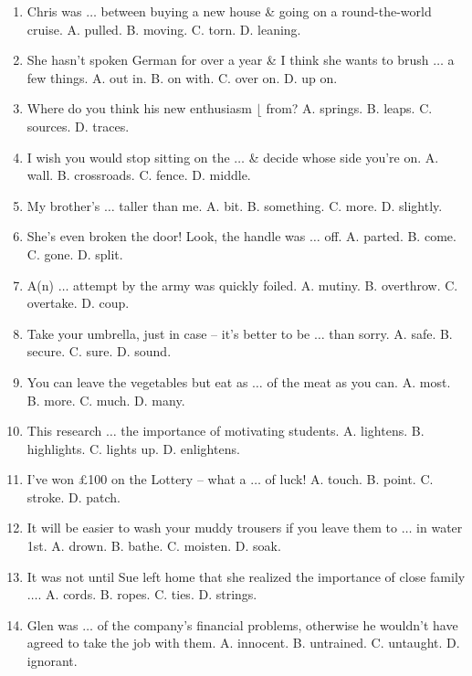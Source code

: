 \documentclass{article}
\numberwithin{equation}{section}
\begin{document}
\begin{enumerate}[leftmargin=8mm]
	\item Chris was $\ldots$ between buying a new house \& going on a round-the-world cruise. {\sf A.} pulled. {\sf B.} moving. {\sf C.} torn. {\sf D.} leaning.
	\item She hasn't spoken German for over a year \& I think she wants to brush $\ldots$ a few things. {\sf A.} out in. {\sf B.} on with. {\sf C.} over on. {\sf D.} up on.
	\item Where do you think his new enthusiasm $\lfloor$ from? {\sf A.} springs. {\sf B.} leaps. {\sf C.} sources. {\sf D.} traces.
	\item I wish you would stop sitting on the $\ldots$ \& decide whose side you're on. {\sf A.} wall. {\sf B.} crossroads. {\sf C.} fence. {\sf D.} middle.
	\item My brother's $\ldots$ taller than me. {\sf A.} bit. {\sf B.} something. {\sf C.} more. {\sf D.} slightly.
	\item She's even broken the door! Look, the handle was $\ldots$ off. {\sf A.} parted. {\sf B.} come. {\sf C.} gone. {\sf D.} split.
	\item A(n) $\ldots$ attempt by the army was quickly foiled. {\sf A.} mutiny. {\sf B.} overthrow. {\sf C.} overtake. {\sf D.} coup.
	\item Take your umbrella, just in case -- it's better to be $\ldots$ than sorry. {\sf A.} safe. {\sf B.} secure. {\sf C.} sure. {\sf D.} sound.
	\item You can leave the vegetables but eat as $\ldots$ of the meat as you can. {\sf A.} most. {\sf B.} more. {\sf C.} much. {\sf D.} many.
	\item This research $\ldots$ the importance of motivating students. {\sf A.} lightens. {\sf B.} highlights. {\sf C.} lights up. {\sf D.} enlightens.
	\item I've won \pounds100 on the Lottery -- what a $\ldots$ of luck! {\sf A.} touch. {\sf B.} point. {\sf C.} stroke. {\sf D.} patch.
	\item It will be easier to wash your muddy trousers if you leave them to $\ldots$ in water 1st. {\sf A.} drown. {\sf B.} bathe. {\sf C.} moisten. {\sf D.} soak.
	\item It was not until Sue left home that she realized the importance of close family $\ldots$. {\sf A.} cords. {\sf B.} ropes. {\sf C.} ties. {\sf D.} strings.
	\item Glen was $\ldots$ of the company's financial problems, otherwise he wouldn't have agreed to take the job with them. {\sf A.} innocent. {\sf B.} untrained. {\sf C.} untaught. {\sf D.} ignorant.

\end{enumerate}
\end{document}
